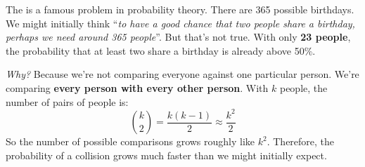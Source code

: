 \highspace
The  is a famous problem in probability theory. There are 365 possible birthdays. We might initially think ``\emph{to have a good chance that two people share a birthday, perhaps we need around 365 people}''. But that's not true. With only \textbf{23 people}, the probability that at least two share a birthday is already above 50\%.

\highspace
\emph{Why?} Because we're not comparing everyone against one particular person. We're comparing \textbf{every person with every other person}. With $k$ people, the number of pairs of people is:
\begin{equation*}
    \binom{k}{2} = \frac{k(k-1)}{2} \approx \frac{k^2}{2}
\end{equation*}
So the number of possible comparisons grows roughly like $k^2$. Therefore, the probability of a collision grows much faster than we might initially expect.

